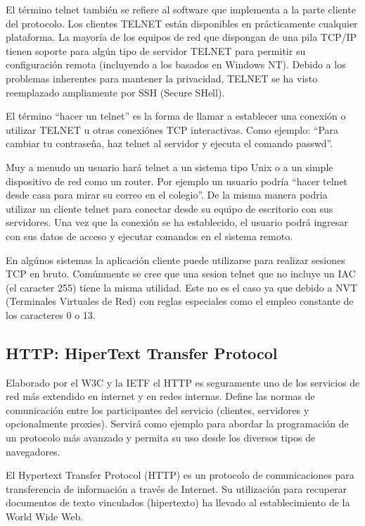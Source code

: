 \documentclass[a4paper,spanish,12pt]{book}
\begin{document}
El término telnet tambi\'en se refiere al software que implementa a la parte cliente del protocolo. Los clientes TELNET están disponibles en prácticamente cualquier plataforma. La mayoría de los equipos de red que dispongan de una pila TCP/IP tienen soporte  para algún tipo de servidor TELNET para permitir su configuración remota (incluyendo a los basados en Windows NT). Debido a los problemas inherentes para mantener la privacidad, TELNET se ha visto reemplazado ampliamente por SSH (Secure SHell).

El término ``hacer un telnet'' es la forma de llamar a establecer una conexión o utilizar TELNET u otras conexiónes TCP interactivas. Como ejemplo: ``Para cambiar tu contraseña, haz telnet al servidor y ejecuta el comando passwd''.

Muy a menudo un usuario hará telnet a un sistema tipo Unix o a un simple dispositivo de red como un router. Por ejemplo un usuario podría ``hacer telnet desde casa para mirar su correo en el colegio''. De la misma manera podria utilizar un cliente telnet para conectar desde su equipo de escritorio con sus servidores. Una vez que la conexión se ha establecido, el usuario podrá ingresar con sus datos de acceso y ejecutar comandos en el sistema remoto.

En algúnos sistemas la aplicación cliente puede utilizarse para realizar sesiones TCP en bruto. Comúnmente se cree que una sesion telnet que no incluye un IAC (el caracter 255) tiene la misma utilidad. Este no es el caso ya que debido a NVT (Terminales Virtuales de Red) con reglas especiales como el empleo constante de los caracteres 0 o 13.

\subsection{HTTP: HiperText Transfer Protocol}
Elaborado por el W3C y la IETF el HTTP es seguramente uno de los servicios de red más extendido en internet y en redes internas. Define las normas de comunicación entre los participantes del servicio (clientes, servidores y opcionalmente proxies). Servirá como ejemplo para abordar la programación de un protocolo m\'as avanzado y permita su uso desde los diversos tipos de navegadores.

El Hypertext Transfer Protocol (HTTP) es un protocolo de comunicaciones para transferencia de información a trav\'es de Internet. Su utilización para recuperar documentos de texto vinculados (hipertexto) ha llevado al establecimiento de la World Wide Web.
\end{document}
